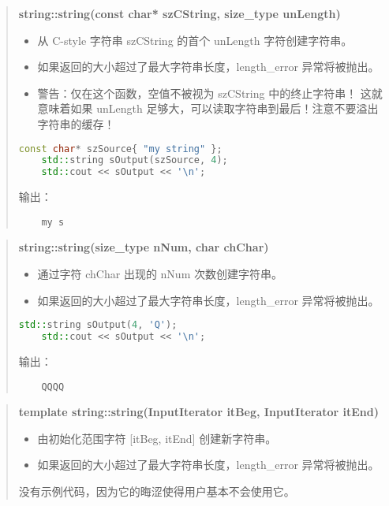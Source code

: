 \documentclass[../../LearnCpp.tex]{subfiles}
\begin{document}
\begin{quotation}
  \textbf{string::string(const char* szCString, size\_type unLength)}

  \begin{itemize}
    \item 从 C-style 字符串 szCString 的首个 unLength 字符创建字符串。
    \item 如果返回的大小超过了最大字符串长度，length\_error 异常将被抛出。
    \item 警告：仅在这个函数，空值不被视为 szCString 中的终止字符串！
          这就意味着如果 unLength 足够大，可以读取字符串到最后！注意不要溢出字符串的缓存！
  \end{itemize}

  \begin{lstlisting}[language=C++]
    const char* szSource{ "my string" };
    std::string sOutput(szSource, 4);
    std::cout << sOutput << '\n';
    \end{lstlisting}

  输出：

  \begin{lstlisting}
    my s
    \end{lstlisting}
\end{quotation}

\begin{quotation}
  \textbf{string::string(size\_type nNum, char chChar)}

  \begin{itemize}
    \item 通过字符 chChar 出现的 nNum 次数创建字符串。
    \item 如果返回的大小超过了最大字符串长度，length\_error 异常将被抛出。
  \end{itemize}

  \begin{lstlisting}[language=C++]
    std::string sOutput(4, 'Q');
    std::cout << sOutput << '\n';
    \end{lstlisting}

  输出：

  \begin{lstlisting}
    QQQQ
    \end{lstlisting}
\end{quotation}

\begin{quotation}
  \textbf{template string::string(InputIterator itBeg, InputIterator itEnd)}

  \begin{itemize}
    \item 由初始化范围字符 [itBeg, itEnd] 创建新字符串。
    \item 如果返回的大小超过了最大字符串长度，length\_error 异常将被抛出。
  \end{itemize}

  没有示例代码，因为它的晦涩使得用户基本不会使用它。
\end{quotation}
\end{document}
